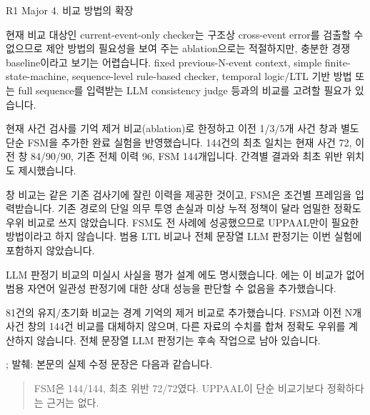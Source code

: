 \begin{reviewitem}{R1 Major 4. 비교 방법의 확장}

\begin{reviewercomment}

현재 비교 대상인 current-event-only checker는 구조상 cross-event error를 검출할 수 없으므로 제안 방법의 필요성을 보여 주는 ablation으로는 적절하지만, 충분한 경쟁 baseline이라고 보기는 어렵습니다. fixed previous-N-event context, simple finite-state-machine, sequence-level rule-based checker, temporal logic/LTL 기반 방법 또는 full sequence를 입력받는 LLM consistency judge 등과의 비교를 고려할 필요가 있습니다.

\end{reviewercomment}

\begin{authorresponse}

현재 사건 검사를 기억 제거 비교(ablation)로 한정하고 이전 1/3/5개 사건 창과 별도 단순 FSM을 추가한 완료 실험을 반영했습니다. 144건의 최초 일치는 현재 사건 72, 이전 창 84/90/90, 기존 전체 이력 96, FSM 144개입니다. 간격별 결과와 최초 위반 위치도 제시했습니다.

창 비교는 같은 기존 검사기에 잘린 이력을 제공한 것이고, FSM은 조건별 프레임을 입력받습니다. 기존 경로의 단일 의무 투영 손실과 미상 누적 정책이 달라 엄밀한 정확도 우위 비교로 쓰지 않았습니다. FSM도 전 사례에 성공했으므로 UPPAAL만이 필요한 방법이라고 하지 않습니다. 범용 LTL 비교나 전체 문장열 LLM 판정기는 이번 실험에 포함하지 않았습니다.

LLM 판정기 비교의 미실시 사실을 평가 설계 에도 명시했습니다. 에는 이 비교가 없어 범용 자연어 일관성 판정기에 대한 상대 성능을 판단할 수 없음을 추가했습니다.

81건의 유지/초기화 비교는 경계 기억의 제거 비교로 추가했습니다. FSM과 이전 N개 사건 창의 144건 비교를 대체하지 않으며, 다른 자료의 수치를 합쳐 정확도 우위를 계산하지 않습니다. 전체 문장열 LLM 판정기는 후속 작업으로 남아 있습니다.

\end{authorresponse}

\begin{manuscriptrevision}{; 발췌: }
본문의 실제 수정 문장은 다음과 같습니다.

\begin{quote}
FSM은 144/144, 최초 위반 72/72였다. UPPAAL이 단순 비교기보다 정확하다는 근거는 없다.
\end{quote}
\end{manuscriptrevision}

\end{reviewitem}

